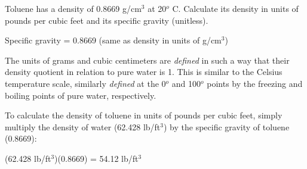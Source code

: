 

Toluene has a density of 0.8669 g/cm$^{3}$ at 20$^{o}$ C.  Calculate its density in units of pounds per cubic feet and its specific gravity (unitless).







Specific gravity = 0.8669 (same as density in units of g/cm$^{3}$)

\vskip 10pt

The units of grams and cubic centimeters are {\it defined} in such a way that their density quotient in relation to pure water is 1.  This is similar to the Celsius temperature scale, similarly {\it defined} at the 0$^{o}$ and 100$^{o}$ points by the freezing and boiling points of pure water, respectively.

To calculate the density of toluene in units of pounds per cubic feet, simply multiply the density of water (62.428 lb/ft$^{3}$) by the specific gravity of toluene (0.8669):

\vskip 10pt

(62.428 lb/ft$^{3}$)(0.8669) = 54.12 lb/ft$^{3}$











